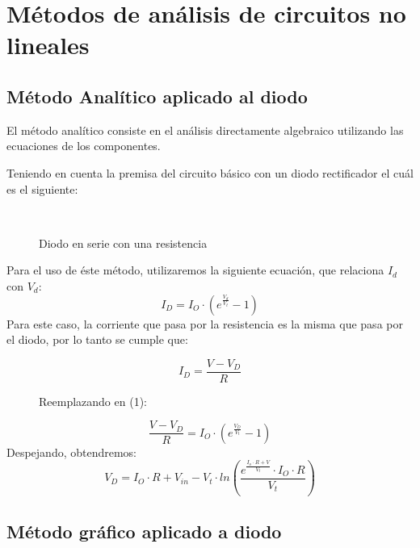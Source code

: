 \documentclass[11pt,fancy,lang=es]{elegantbook}
\begin{document}
\section{Métodos de análisis de circuitos no lineales}
\subsection{Método Analítico aplicado al diodo}
\begin{remark}
    El método analítico consiste en el análisis directamente algebraico utilizando las ecuaciones de los componentes.
\end{remark}


Teniendo en cuenta la premisa del circuito básico con un diodo rectificador el cuál es el siguiente:

\begin{figure}[h!]
    \centering
        \
    \caption{Diodo en serie con una resistencia}
\end{figure}

Para el uso de éste método, utilizaremos la siguiente ecuación, que relaciona $I_{d}$ con $V_d$:
\begin{equation}
    I_D=I_O \cdot (e^\frac{V_d}{V_t}-1)
\end{equation}
Para este caso, la corriente que pasa por la resistencia es la misma que pasa por el diodo, por lo tanto se cumple que:

\begin{equation}
    I_D=\frac{V-V_D}{R}
\end{equation}
\begin{figure}[h]
    \centering
    Reemplazando en (1):
\end{figure}

\begin{equation}
    \frac{V-V_D}{R}=I_O \cdot (e^\frac{V_D}{V_t}-1)
\end{equation}
Despejando, obtendremos:
\begin{equation}
    V_D=I_O\cdot R + V_{in} - V_t \cdot ln(\frac{e^\frac{I_o\cdot R+V}{V_t}\cdot I_O \cdot R}{V_t})
\end{equation}
\newpage

\subsection{Método gráfico aplicado a diodo}
\end{document}
